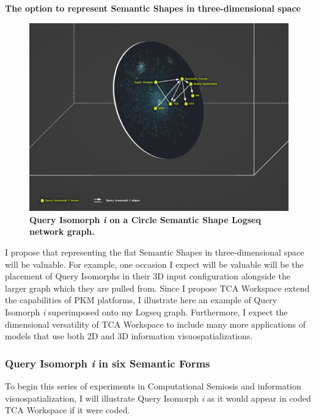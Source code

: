 \noindent \textbf{The option to represent Semantic Shapes in three-dimensional space}
\\
\FloatBarrier  
\begin{figure}[h!]
    \centering
    \includegraphics[width=\textwidth]{figures/5.9.Semantic Shape Circle.png}
    \caption[Query Isomorph \textit{i} on a Circle Semantic Shape Logseq network graph]{\textbf{Query Isomorph \textit{i} on a Circle Semantic Shape Logseq network graph.}}
    \label{f5.9.Semantic Shape Circle}
\end{figure}
\par
\FloatBarrier  

I propose that representing the flat Semantic Shapes in three-dimensional space will be valuable. For example, one occasion I expect will be valuable will be the placement of Query Isomorphs in their 3D input configuration alongside the larger graph which they are pulled from. Since I propose TCA Workspace extend the capabilities of PKM platforms, I illustrate here an example of Query Isomorph \textit{i} superimposed onto my Logseq graph. Furthermore, I expect the dimensional versatility of TCA Workspace to include many more applications of models that use both 2D and 3D information visuospatializations. 


\subsubsection{Query Isomorph \textit{i} in six Semantic Forms}
To begin this series of experiments in Computational Semiosis and information visuospatialization, I will illustrate Query Isomorph \textit{i} as it would appear in coded TCA Workspace if it were coded. 

